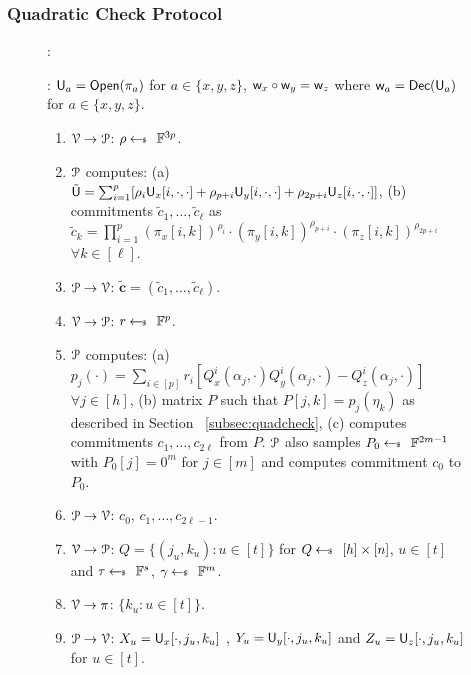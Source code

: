\subsubsection{Quadratic Check Protocol}

\begin{figure}[h!]
	{\footnotesize
		\begin{framed}
			:
			
			: $\ewit_a=\open(\pi_a)$ for $a\in \{x,y,z\}$, $\wit_x \circ \wit_y = \wit_z$ where  $\wit_a=\dec(\ewit_a)$ for $a\in \{x,y,z\}$.
			
			\begin{enumerate}[{\rm 1.}]
				\item $\verifier\rightarrow\prover$: $\rho\sample \FF^{3p}$.
				\item $\prover$ computes: (a) $\tilde{\ewit}=\sum_{i=1}^p[\rho_i\ewit_x[i,\cdot,\cdot] + \rho_{p+i}\ewit_y[i,\cdot,\cdot]+\rho_{2p+i}\ewit_z[i,\cdot,\cdot]]$, (b)
				commitments $\tilde{c}_1,\ldots,\tilde{c}_\ell$ as $\tilde{c}_k = \prod_{i=1}^{p} (\pi_x[i,k])^{\rho_i}\cdot (\pi_y[i,k])^{\rho_{p+i}}\cdot(\pi_z[i,k])^{\rho_{2p+i}}$ $\forall k\in[\ell]$.
				\item $\prover\rightarrow\verifier$: $\tilde{\bm{c}}=(\tilde{c}_1,\ldots,\tilde{c}_\ell)$.
				\item $\verifier\rightarrow\prover$: $r\sample \FF^p$.
				\item $\prover$ computes: (a) $p_j(\cdot) = \sum_{i\in[p]} r_i[Q^i_x(\alpha_j,\cdot)Q^i_y(\alpha_j,\cdot) - Q^i_z(\alpha_j,\cdot)]$ $\forall j\in [h]$, (b) matrix $P$ such that $P[j,k] = p_j(\eta_k)$ as described in Section ~\ref{subsec:quadcheck}, (c) computes commitments $c_1,\ldots,c_{2\ell}$ from $P$. $\prover$ also samples $P_0\sample \FF^{2m-1}$ with $P_0[j]=0^m$ for $j\in[m]$ and computes commitment $c_0$ to $P_0$.
				\item $\prover\rightarrow\verifier$: $c_0$, $c_1,\ldots,c_{2\ell-1}$.
				\item $\verifier\rightarrow\prover$: $Q=\{(j_u,k_u):u\in [t]\}$ for $Q\sample [h]\times [n]$, $u\in [t]$ and $\tau \sample \FF^s$, $\gamma \sample \FF^m$.
				\item $\verifier\rightarrow\pi$: $\{k_u:u\in [t]\}$.
				\item $\prover\rightarrow\verifier$: $X_u=\ewit_x[\cdot,j_u,k_u]$ , $Y_u=\ewit_y[\cdot,j_u,k_u]$ and $Z_u=\ewit_z[\cdot,j_u,k_u]$ for $u\in [t]$.

\end{enumerate}
\end{framed}}
\end{figure}
